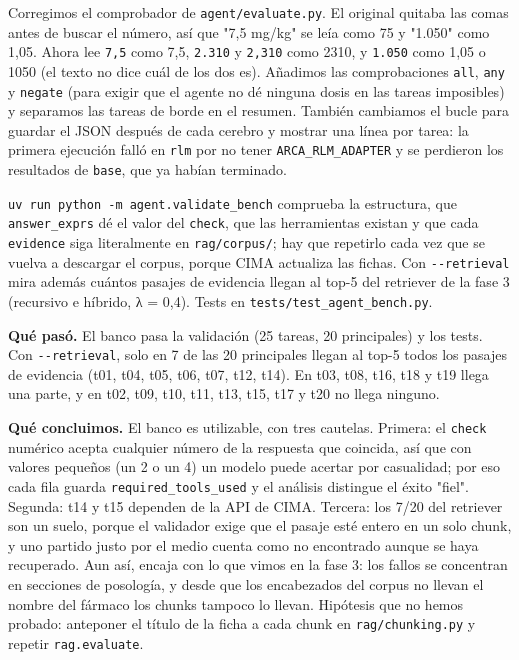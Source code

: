 Corregimos el comprobador de \texttt{agent/\allowbreak{}evaluate.py}. El original quitaba las comas antes de buscar el
número, así que "7,5 mg/kg" se leía como 75 y "1.050" como 1,05. Ahora lee \texttt{7,5} como 7,5, \texttt{2.310} y
\texttt{2,310} como 2310, y \texttt{1.050} como 1,05 o 1050 (el texto no dice cuál de los dos es). Añadimos las
comprobaciones \texttt{all}, \texttt{any} y \texttt{negate} (para exigir que el agente no dé ninguna dosis en las tareas
imposibles) y separamos las tareas de borde en el resumen. También cambiamos el bucle para guardar el
JSON después de cada cerebro y mostrar una línea por tarea: la primera ejecución falló en \texttt{rlm} por no
tener \texttt{ARCA\_\allowbreak{}RLM\_\allowbreak{}ADAPTER} y se perdieron los resultados de \texttt{base}, que ya habían terminado.

\texttt{uv run python -m agent.validate\_\allowbreak{}bench} comprueba la estructura, que \texttt{answer\_\allowbreak{}exprs} dé el valor del
\texttt{check}, que las herramientas existan y que cada \texttt{evidence} siga literalmente en \texttt{rag/\allowbreak{}corpus/\allowbreak{}}; hay que
repetirlo cada vez que se vuelva a descargar el corpus, porque CIMA actualiza las fichas. Con
\texttt{-\/\allowbreak{}-retrieval} mira además cuántos pasajes de evidencia llegan al top-5 del retriever de la fase 3
(recursivo e híbrido, λ = 0,4). Tests en \texttt{tests/\allowbreak{}test\_\allowbreak{}agent\_\allowbreak{}bench.py}.

\textbf{Qué pasó.} El banco pasa la validación (25 tareas, 20 principales) y los tests. Con \texttt{-\/\allowbreak{}-retrieval}, solo
en 7 de las 20 principales llegan al top-5 todos los pasajes de evidencia (t01, t04, t05, t06, t07, t12,
t14). En t03, t08, t16, t18 y t19 llega una parte, y en t02, t09, t10, t11, t13, t15, t17 y t20 no llega
ninguno.

\textbf{Qué concluimos.} El banco es utilizable, con tres cautelas. Primera: el \texttt{check} numérico acepta
cualquier número de la respuesta que coincida, así que con valores pequeños (un 2 o un 4) un modelo
puede acertar por casualidad; por eso cada fila guarda \texttt{required\_\allowbreak{}tools\_\allowbreak{}used} y el análisis distingue el
éxito "fiel". Segunda: t14 y t15 dependen de la API de CIMA. Tercera: los 7/20 del retriever son un
suelo, porque el validador exige que el pasaje esté entero en un solo chunk, y uno partido justo por el
medio cuenta como no encontrado aunque se haya recuperado. Aun así, encaja con lo que vimos en la
fase 3: los fallos se concentran en secciones de posología, y desde que los encabezados del corpus no
llevan el nombre del fármaco los chunks tampoco lo llevan. Hipótesis que no hemos probado: anteponer el
título de la ficha a cada chunk en \texttt{rag/\allowbreak{}chunking.py} y repetir \texttt{rag.evaluate}.

